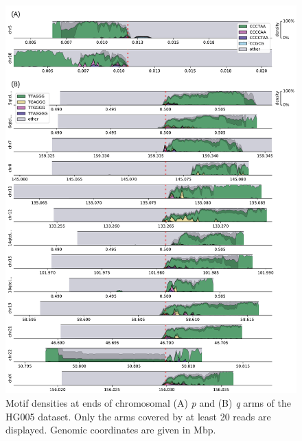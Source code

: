 \documentclass{article}
\begin{document}
\begin{figure}[ht!] \centering
\includegraphics[height=.95\textheight,width=\textwidth,keepaspectratio]{figures/HG005-densityplots.pdf}
\caption{
    Motif densities at ends of chromosomal (A) \textit{p} and (B) \textit{q} arms of the HG005 dataset.
    Only the arms covered by at least 20 reads are displayed.
    Genomic coordinates are given in Mbp.
}
\label{fig:hg005_densityplots}
\end{figure}
\clearpage \pagebreak
\end{document}
